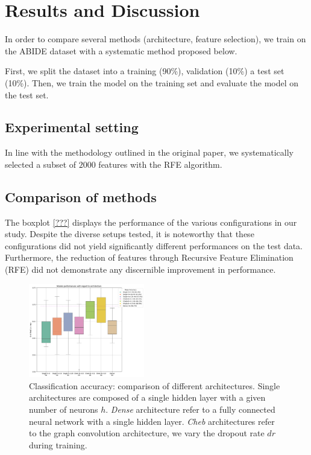 \section{Results and Discussion}
In order to compare several methods (architecture, feature selection), we train on the ABIDE dataset
with a systematic method proposed below.

First, we split the dataset into a training (90\%), validation (10\%) a test set (10\%).
Then, we train the model on the training set and evaluate the model on the test set.

\subsection{Experimental setting}

In line with the methodology outlined in the original paper, we systematically selected a subset of $2000$ features with the RFE algorithm. 



\subsection{Comparison of methods}

The boxplot \ref{???} displays the performance of the various configurations in our study. Despite the diverse setups tested, it is noteworthy that these configurations did not yield significantly different performances on the test data. Furthermore, the reduction of features through Recursive Feature Elimination (RFE) did not demonstrate any discernible improvement in performance.

\begin{figure}[h!]
    \centering
    \includegraphics[width=0.45\textwidth]{figures/model_performances_architecture.png}
    \caption{Classification accuracy: comparison of different architectures.
    Single architectures are composed of a single hidden layer with a given number of neurons $h$.
    \textit{Dense} architecture refer to a fully connected neural network with a single hidden layer.
    \textit{Cheb} architectures refer to the graph convolution architecture, we vary the dropout rate $dr$
    during training.}
    \Description{}
    \label{fig:results_architecture}
\end{figure}

